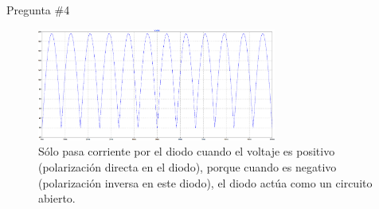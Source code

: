 \documentclass[
    10pt,
    aspectratio=169,
    xcolor={dvipsnames},
    spanish,
    ]{beamer}
\begin{document}
\begin{frame}{Pregunta \#4}
  \begin{figure}[H]
    \centering
    \includegraphics[width=0.7\textwidth]{Auxiliar_4_21}
  \caption{Sólo pasa corriente por el diodo cuando el voltaje es positivo (polarización directa en el diodo), porque cuando es negativo (polarización inversa en este diodo), el diodo actúa como un circuito abierto.}
    \label{fig:voltaje-corriente-diodo-detalle}

\end{figure}
\end{frame}
\end{document}

